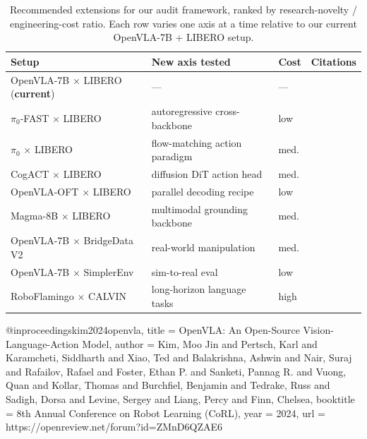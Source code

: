 \begin{table}[t]
\centering
\caption{Recommended extensions for our audit framework, ranked by
research-novelty / engineering-cost ratio. Each row varies one axis at
a time relative to our current OpenVLA-7B + LIBERO setup.}
\label{tab:extension_plan}
\renewcommand{\arraystretch}{1.2}
\setlength{\tabcolsep}{6pt}
\small
\begin{tabular}{l l l l}
\toprule
\textbf{Setup} & \textbf{New axis tested} &
\textbf{Cost} & \textbf{Citations} \\
\midrule
OpenVLA-7B $\times$ LIBERO (\textbf{current})
  & ---                              & ---  & \cite{kim2024openvla, liu2023libero} \\[2pt]

$\pi_{0}$-FAST $\times$ LIBERO
  & autoregressive cross-backbone   & low  & \cite{pertsch2025fast, liu2023libero} \\
$\pi_{0}$ $\times$ LIBERO
  & flow-matching action paradigm   & med. & \cite{black2024pi0, liu2023libero} \\
CogACT $\times$ LIBERO
  & diffusion DiT action head       & med. & \cite{li2024cogact, liu2023libero} \\
OpenVLA-OFT $\times$ LIBERO
  & parallel decoding recipe        & low  & \cite{kim2025oft, liu2023libero} \\
Magma-8B $\times$ LIBERO
  & multimodal grounding backbone   & med. & \cite{yang2025magma, liu2023libero} \\[2pt]

OpenVLA-7B $\times$ BridgeData V2
  & real-world manipulation         & med. & \cite{kim2024openvla, walke2023bridgev2} \\
OpenVLA-7B $\times$ SimplerEnv
  & sim-to-real eval                & low  & \cite{kim2024openvla, li2024simplerenv} \\
RoboFlamingo $\times$ CALVIN
  & long-horizon language tasks     & high & \cite{li2024roboflamingo, mees2022calvin} \\
\bottomrule
\end{tabular}
\end{table}




@inproceedings{kim2024openvla,
  title     = {{OpenVLA}: An Open-Source Vision-Language-Action Model},
  author    = {Kim, Moo Jin and Pertsch, Karl and Karamcheti, Siddharth
               and Xiao, Ted and Balakrishna, Ashwin and Nair, Suraj
               and Rafailov, Rafael and Foster, Ethan P. and Sanketi, Pannag R.
               and Vuong, Quan and Kollar, Thomas and Burchfiel, Benjamin
               and Tedrake, Russ and Sadigh, Dorsa and Levine, Sergey
               and Liang, Percy and Finn, Chelsea},
  booktitle = {8th Annual Conference on Robot Learning (CoRL)},
  year      = {2024},
  url       = {https://openreview.net/forum?id=ZMnD6QZAE6}
}

